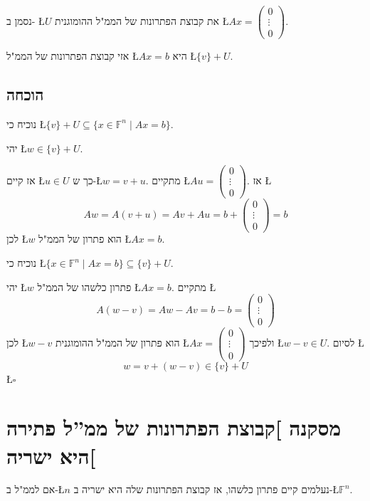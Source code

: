 \documentclass[english,hebrew]{article}
\begin{document}
נסמן ב- \L{$U$} את קבוצת הפתרונות של הממ"ל ההומוגנית \L{$Ax=\begin{pmatrix}0\\
\vdots\\
0
\end{pmatrix}$}.

אזי קבוצת הפתרונות של הממ"ל \L{$Ax=b$} היא \L{$\{v\}+U$}.

\subsection{הוכחה}

נוכיח כי \L{$\{v\}+U\subseteq\{x\in\mathbb{F}^{n}\mid Ax=b\}$}.

יהי \L{$w\in\{v\}+U$}.

אז קיים \L{$u\in U$} כך ש-\L{$w=v+u$}. מתקיים \L{$Au=\begin{pmatrix}0\\
\vdots\\
0
\end{pmatrix}$}. אז \L{%
\[
Aw=A(v+u)=Av+Au=b+\begin{pmatrix}0\\
\vdots\\
0
\end{pmatrix}=b
\]
}%
לכן \L{$w$} הוא פתרון של הממ"ל \L{$Ax=b$}.

נוכיח כי \L{$\{x\in\mathbb{F}^{n}\mid Ax=b\}\subseteq\{v\}+U$}.
\begin{flushright}
יהי \L{$w$} פתרון כלשהו של הממ"ל \L{$Ax=b$}. מתקיים \L{%
\[
A(w-v)=Aw-Av=b-b=\begin{pmatrix}0\\
\vdots\\
0
\end{pmatrix}
\]
}%
לכן \L{$w-v$} הוא פתרון של הממ"ל ההומוגנית \L{$Ax=\begin{pmatrix}0\\
\vdots\\
0
\end{pmatrix}$} ולפיכך \L{$w-v\in U$}. לסיום \L{%
\[
w=v+(w-v)\in\{v\}+U
\]
}%
\L{$\square$}
\par\end{flushright}

\section{מסקנה {]}קבוצת הפתרונות של ממ\textquotedblright ל פתירה היא ישריה{[}}

אם לממ"ל ב-\L{$n$} נעלמים קיים פתרון כלשהו, אז קבוצת הפתרונות שלה
היא ישריה ב-\L{$\mathbb{F}^{n}$}.
\end{document}
